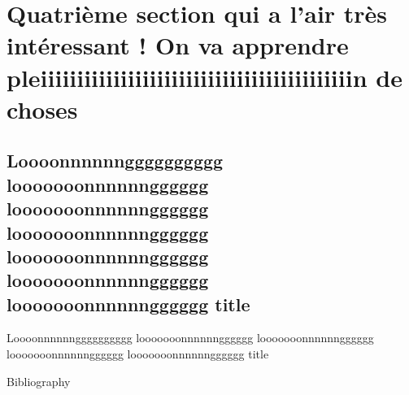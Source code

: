 \documentclass[aspectratio=169]{my-beamer}
\begin{document}
\begin{frame}
\lipsum[1]

\end{frame}

\section{Quatrième section qui a l'air très intéressant ! On va apprendre pleiiiiiiiiiiiiiiiiiiiiiiiiiiiiiiiiiiiiiiiiiiin de choses}


\subsection{Loooonnnnnngggggggggg looooooonnnnnngggggg looooooonnnnnngggggg looooooonnnnnngggggg looooooonnnnnngggggg looooooonnnnnngggggg looooooonnnnnngggggg title}

\begin{frame}{Loooonnnnnngggggggggg looooooonnnnnngggggg looooooonnnnnngggggg looooooonnnnnngggggg looooooonnnnnngggggg title}
\lipsum[1]
\end{frame}

\begin{frame}{Bibliography}
\printbibliography
\end{frame}

 
\end{document}
